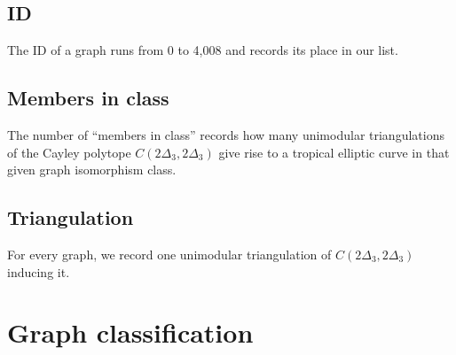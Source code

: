 \documentclass[a4paper, DIV=17, twocolumn]{scrartcl}
\begin{document}
	\subsection{ID}
	The ID of a graph runs from $0$ to 4,008 and records its place in our list.
	
	\subsection{Members in class}
	The number of \enquote{members in class} records how many unimodular triangulations of the Cayley polytope $C(2\Delta_3, 2\Delta_3)$ give rise to a tropical elliptic curve in that given graph isomorphism class.
	
	\subsection{Triangulation}
	For every graph, we record one unimodular triangulation of $C(2\Delta_3, 2\Delta_3)$ inducing it. 
	
	\section{Graph classification}
	\setlength{\parindent}{0pt}
	
	
\end{document}
